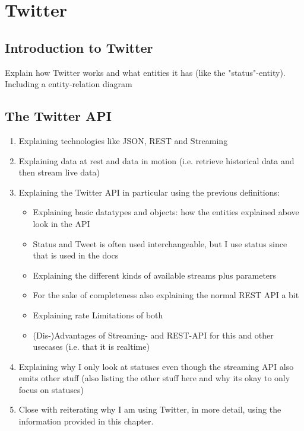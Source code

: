 \chapter{Twitter}
\label{ch:twitter}

\section{Introduction to Twitter}
\label{sec:twitter}

Explain how Twitter works and what entities it has (like the "status"-entity).
Including a entity-relation diagram

\section{The Twitter API}
\label{sec:theApi}

\begin{enumerate}
    \item
    Explaining technologies like JSON, REST and Streaming
    \item
    Explaining data at rest and data in motion (i.e. retrieve historical data and then stream live data)
    \item
    Explaining the Twitter API in particular using the previous definitions:
    \begin{itemize}
        \item
        Explaining basic datatypes and objects: how the entities explained above look in the API
        \item
        Status and Tweet is often used interchangeable, but I use status since that is used in the docs
        \item
        Explaining the different kinds of available streams plus parameters
        \item
        For the sake of completeness also explaining the normal REST API a bit
        \item
        Explaining rate Limitations of both
        \item
        (Dis-)Advantages of Streaming- and REST-API for this and other usecases (i.e. that it is realtime)
    \end{itemize}
    \item
    Explaining why I only look at statuses even though the streaming API also emits other stuff (also listing the other stuff here and why its okay to only focus on statuses)
    \item
    Close with reiterating why I am using Twitter, in more detail, using the information provided in this chapter.
\end{enumerate}

